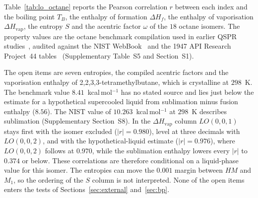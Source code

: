 \documentclass[a5paper, 10pt]{article}
\theoremstyle{plain}
\theoremstyle{remark}
\theoremstyle{definition}
\begin{document}
Table~\ref{tab:lo_octane} reports the Pearson correlation $r$ between
each index and the boiling point $T_B$, the enthalpy of formation
$\Delta H_f$, the enthalpy of vaporisation $\Delta H_{\mathrm{vap}}$, the
entropy $S$ and the acentric factor $\omega$ of the $18$ octane isomers.
The property values are the octane benchmark compilation used in earlier QSPR studies~\cite{Ediz2017Octane, MondalDePal2019QSPR}, audited
against the NIST WebBook~\cite{NISTWebBook} and the 1947 API Research
Project~44 tables~\cite{APIProject44Circ461} (Supplementary Table~S5
and Section~S1).

The open items are seven entropies, the compiled
acentric factors and the vaporisation enthalpy of
2,2,3,3-tetramethylbutane, which is crystalline at $298$~K. The benchmark value $8.41$~kcal\,mol$^{-1}$ has no stated source and lies just below the estimate for a hypothetical supercooled liquid from sublimation minus fusion enthalpy ($8.56$). The NIST value of $10.263$~kcal\,mol$^{-1}$ at $298$~K
describes sublimation (Supplementary Section~S8). In the
$\Delta H_{\mathrm{vap}}$ column $LO(0,0,1)$ stays first with the isomer excluded ($|r| = 0.980$), level at three decimals with $LO(0,0,2)$, and with the hypothetical-liquid estimate
($|r| = 0.976$), where $LO(0,0,2)$ follows at $0.970$, while the sublimation enthalpy lowers every $|r|$ to
$0.374$ or below. These correlations are therefore conditional on a
liquid-phase value for this isomer. The entropies can move the $0.001$
margin between $HM$ and $M_1$, so the ordering of the $S$ column is not
interpreted. None of the open items enters the tests of
Sections~\ref{sec:external} and~\ref{sec:bp}.
\end{document}
